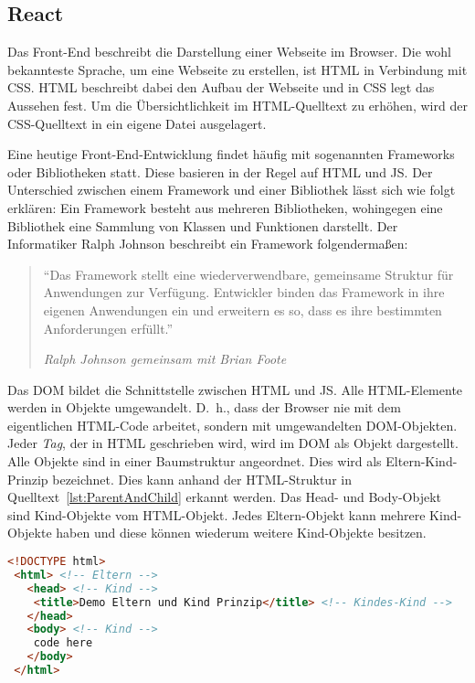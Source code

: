 \subsection{React}
\label{ssec:React}

Das Front-End beschreibt die Darstellung einer Webseite im Browser.
Die wohl bekannteste Sprache, um eine Webseite zu erstellen, ist \acs{HTML} in Verbindung mit \acs{CSS}.
\acs{HTML} beschreibt dabei den Aufbau der Webseite und in \acs{CSS} legt das Aussehen fest.
Um die Übersichtlichkeit im \acs{HTML}-Quelltext zu erhöhen, wird der \acs{CSS}-Quelltext in ein eigene Datei ausgelagert.

Eine heutige Front-End-Entwicklung findet häufig mit sogenannten Frameworks oder Bibliotheken statt.
Diese basieren in der Regel auf \acs{HTML} und \ac{JS}.
Der Unterschied zwischen einem Framework und einer Bibliothek lässt sich wie folgt erklären:
Ein Framework besteht aus mehreren Bibliotheken, wohingegen eine Bibliothek eine Sammlung von Klassen und Funktionen darstellt.\autocite[Vgl.][]{Libary_vs_Framework}
Der Informatiker Ralph Johnson beschreibt ein Framework folgendermaßen:
%
\begin{quote}
	\enquote{Das Framework stellt eine wiederverwendbare, gemeinsame Struktur für Anwendungen zur Verfügung. Entwickler binden das Framework in ihre eigenen Anwendungen ein und erweitern es so, dass es ihre bestimmten Anforderungen erfüllt.}
	\begin{center}{\textit{Ralph Johnson gemeinsam mit Brian Foote}}\end{center}
\end{quote}
%

Das \ac{DOM} bildet die Schnittstelle zwischen \acs{HTML} und \ac{JS}.
Alle \acs{HTML}-Elemente werden in Objekte umgewandelt.
D.~h., dass der Browser nie mit dem eigentlichen \acs{HTML}-Code arbeitet, sondern mit umgewandelten \ac{DOM}-Objekten.
Jeder \emph{Tag}, der in \ac{HTML} geschrieben wird, wird im \ac{DOM} als Objekt dargestellt.
Alle Objekte sind in einer Baumstruktur angeordnet.
Dies wird als Eltern-Kind-Prinzip bezeichnet.
Dies kann anhand der \acs{HTML}-Struktur in Quelltext~\vref{lst:ParentAndChild} erkannt werden.
Das Head- und Body-Objekt sind Kind-Objekte vom \acs{HTML}-Objekt.
Jedes Eltern-Objekt kann mehrere Kind-Objekte haben und diese können wiederum weitere Kind-Objekte besitzen.
\begin{lstlisting}[caption={Eltern-Kind-Prinzip},label={lst:ParentAndChild},language=HTML, showstringspaces={false}]
<!DOCTYPE html>
 <html> <!-- Eltern -->
   <head> <!-- Kind -->
    <title>Demo Eltern und Kind Prinzip</title> <!-- Kindes-Kind -->
   </head>
   <body> <!-- Kind -->
    code here
   </body>
 </html>
\end{lstlisting}

